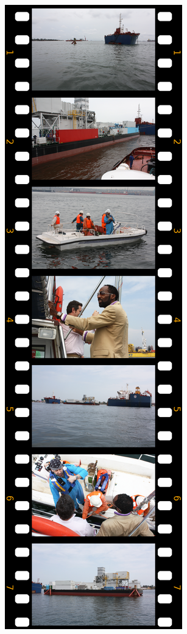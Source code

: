 
\begin{minipage}[c]{.4\linewidth}
  \includegraphics[height=\textheight]{filmVertP1.png}
\end{minipage}\hfill

